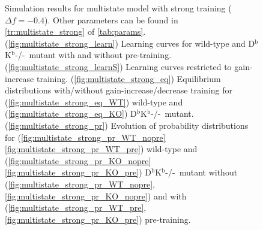 \documentclass[12pt]{article}
\newcommand{\KO}{D$^\mathrm{b}$K$^\mathrm{b}$-/-}
\begin{document}
\begin{figure}
 \begin{center}
 \begin{myenuma}
  \item{}\label{fig:multistate_strong_learn}
  \item{}\label{fig:multistate_strong_learnS}
  \item\label{fig:multistate_strong_eq}\begin{myenumi}
                    \item{}\label{fig:multistate_strong_eq_WT}
                    \item{}\label{fig:multistate_strong_eq_KO}
                  \end{myenumi}
  \item\label{fig:multistate_strong_pr}\begin{myenumi}
                    \item{}\label{fig:multistate_strong_pr_WT_nopre}
                    \item{}\label{fig:multistate_strong_pr_WT_pre}
                    \item{}\label{fig:multistate_strong_pr_KO_nopre}
                    \item{}\label{fig:multistate_strong_pr_KO_pre}
                  \end{myenumi}
 \end{myenuma}
 \end{center}
  \caption{Simulation results for multistate model with strong training ($\Delta f=-0.4$).
  Other parameters can be found in \autoref{tr:multistate_strong} of \autoref{tab:params}.
  (\ref{fig:multistate_strong_learn}) Learning curves for wild-type and \KO\ mutant with and without pre-training.
  (\ref{fig:multistate_strong_learnS}) Learning curves restricted to gain-increase training.
  (\ref{fig:multistate_strong_eq}) Equilibrium distributions with/without gain-increase/decrease training for (\ref{fig:multistate_strong_eq_WT}) wild-type and (\ref{fig:multistate_strong_eq_KO}) \KO\ mutant.
  (\ref{fig:multistate_strong_pr}) Evolution of probability distributions for (\ref{fig:multistate_strong_pr_WT_nopre}\ref{fig:multistate_strong_pr_WT_pre}) wild-type and  (\ref{fig:multistate_strong_pr_KO_nopre}\ref{fig:multistate_strong_pr_KO_pre}) \KO\ mutant without (\ref{fig:multistate_strong_pr_WT_nopre},\ref{fig:multistate_strong_pr_KO_nopre}) and with (\ref{fig:multistate_strong_pr_WT_pre},\ref{fig:multistate_strong_pr_KO_pre}) pre-training. } \label{fig:multistate_strong}
\end{figure}
\end{document}
